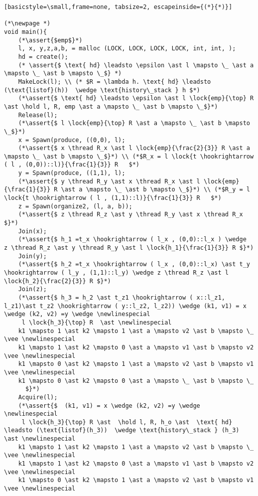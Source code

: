\documentclass[8pt]{article}
\newcommand{\lock}[2]{ \square \hspace{-1ex} \xrightarrow[#1]{#2}}
\newcommand{\thread}{\ocircle \hspace{-1ex} \rightarrow}
\newcommand{\hold}{\text{Hold }}
\newcommand{\assert}[1]{\textcolor{blue}{ \{ #1 \}  } }
\newcommand{\newlinespecial}{\newline \hphantom{100pt}}
\begin{document}
\begin{lstlisting}[basicstyle=\small,frame=none, tabsize=2, escapeinside={(*}{*)}]
		
(*\newpage *)		
void main(){
	(*\assert{$emp$}*)
	l, x, y,z,a,b, = malloc (LOCK, LOCK, LOCK, LOCK, int, int, );
	hd = create();
	(* \assert{$ \text{ hd} \leadsto \epsilon \ast l \mapsto \_ \ast a \mapsto \_ \ast b \mapsto \_$} *)
	MakeLock(l); \\ (* $R = \lambda h. \text{ hd} \leadsto (\text{listof}(h))  \wedge \text{history\_stack } h $*)
	(*\assert{$ \text{ hd} \leadsto \epsilon \ast l \lock{emp}{\top} R \ast \hold l, R, emp \ast a \mapsto \_ \ast b \mapsto \_$}*) 	
	Release(l);
	(*\assert{$ l \lock{emp}{\top} R \ast a \mapsto \_ \ast b \mapsto \_$}*)
	x = Spawn(produce, ((0,0), l);
	(*\assert{$ x \thread R_x \ast l \lock{emp}{\frac{2}{3}} R \ast a \mapsto \_ \ast b \mapsto \_$}*) \\ (*$R_x = l \lock{t \hookrightarrow ( l , (0,0))::l)}{\frac{1}{3}} R   $*)
	y = Spawn(produce, ((1,1), l);
	(*\assert{$ y \thread R_y \ast x \thread R_x \ast l \lock{emp}{\frac{1}{3}} R \ast a \mapsto \_ \ast b \mapsto \_$}*) \\ (*$R_y = l \lock{t \hookrightarrow ( l , (1,1)::l)}{\frac{1}{3}} R   $*)
	z = Spawn(organize2, (l, a, b));
	(*\assert{$ z \thread R_z \ast y \thread R_y \ast x \thread R_x $}*) 
	Join(x);
	(*\assert{$ h_1 =t_x \hookrightarrow ( l_x , (0,0)::l_x ) \wedge  z \thread R_z \ast y \thread R_y \ast l \lock{h_1}{\frac{1}{3}} R $}*) 
	Join(y);
	(*\assert{$ h_2 =t_x \hookrightarrow ( l_x , (0,0)::l_x) \ast t_y \hookrightarrow ( l_y , (1,1)::l_y) \wedge z \thread R_z \ast l \lock{h_2}{\frac{2}{3}} R $}*) 
	Join(z);
	(*\assert{$ h_3 = h_2 \ast t_z1 \hookrightarrow ( x::l_z1, l_z1)\ast t_z2 \hookrightarrow ( y::l_z2, l_z2)) \wedge (k1, v1) = x \wedge (k2, v2) =y \wedge \newlinespecial
	 l \lock{h_3}{\top} R  \ast \newlinespecial
	k1 \mapsto 1 \ast k2 \mapsto 1 \ast a \mapsto v2 \ast b \mapsto \_ \vee \newlinespecial
	k1 \mapsto 1 \ast k2 \mapsto 0 \ast a \mapsto v1 \ast b \mapsto v2 \vee \newlinespecial
	k1 \mapsto 0 \ast k2 \mapsto 1 \ast a \mapsto v2 \ast b \mapsto v1 \vee \newlinespecial
	k1 \mapsto 0 \ast k2 \mapsto 0 \ast a \mapsto \_ \ast b \mapsto \_
	  $}*) 
	Acquire(l);
	(*\assert{$  (k1, v1) = x \wedge (k2, v2) =y \wedge \newlinespecial
	 l \lock{h_3}{\top} R \ast  \hold l, R, h_o \ast  \text{ hd} \leadsto (\text{listof}(h_3))  \wedge \text{history\_stack } (h_3) \ast \newlinespecial
	k1 \mapsto 1 \ast k2 \mapsto 1 \ast a \mapsto v2 \ast b \mapsto \_ \vee \newlinespecial
	k1 \mapsto 1 \ast k2 \mapsto 0 \ast a \mapsto v1 \ast b \mapsto v2 \vee \newlinespecial
	k1 \mapsto 0 \ast k2 \mapsto 1 \ast a \mapsto v2 \ast b \mapsto v1 \vee \newlinespecial

\end{lstlisting}
\end{document}
